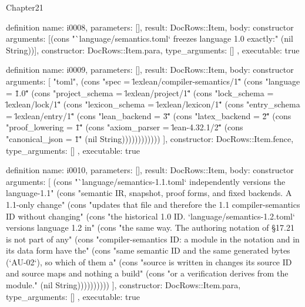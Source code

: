 \begin{lexlean}{Chapter21}
\begin{semanticmodule}
definition{
  name: i0008,
  parameters: [],
  result: DocRows::Item,
  body: constructor{
    arguments: [(cons "`language/semantics.toml` freezes language 1.0 exactly:" (nil String))],
    constructor: DocRows::Item.para,
    type_arguments: []
  },
  executable: true
}

definition{
  name: i0009,
  parameters: [],
  result: DocRows::Item,
  body: constructor{
    arguments: [
      "toml",
      (cons "spec = \"lexlean/compiler-semantics/1\"" (cons "language = \"1.0\"" (cons "project_schema = \"lexlean/project/1\"" (cons "lock_schema = \"lexlean/lock/1\"" (cons "lexicon_schema = \"lexlean/lexicon/1\"" (cons "entry_schema = \"lexlean/entry/1\"" (cons "lean_backend = \"3\"" (cons "latex_backend = \"2\"" (cons "proof_lowering = \"1\"" (cons "axiom_parser = \"lean-4.32.1/2\"" (cons "canonical_json = \"1\"" (nil String))))))))))))
    ],
    constructor: DocRows::Item.fence,
    type_arguments: []
  },
  executable: true
}

definition{
  name: i0010,
  parameters: [],
  result: DocRows::Item,
  body: constructor{
    arguments: [
      (cons "`language/semantics-1.1.toml` independently versions the language-1.1" (cons "semantic IR, snapshot, proof forms, and fixed backends. A 1.1-only change" (cons "updates that file and therefore the 1.1 compiler-semantics ID without changing" (cons "the historical 1.0 ID. `language/semantics-1.2.toml` versions language 1.2 in" (cons "the same way. The authoring notation of §17.21 is not part of any" (cons "compiler-semantics ID: a module in the notation and in its data form have the" (cons "same semantic ID and the same generated bytes (`AU-02`), so which of them a" (cons "source is written in changes its source ID and source maps and nothing a build" (cons "or a verification derives from the module." (nil String))))))))))
    ],
    constructor: DocRows::Item.para,
    type_arguments: []
  },
  executable: true
}


\end{semanticmodule}
\end{lexlean}
